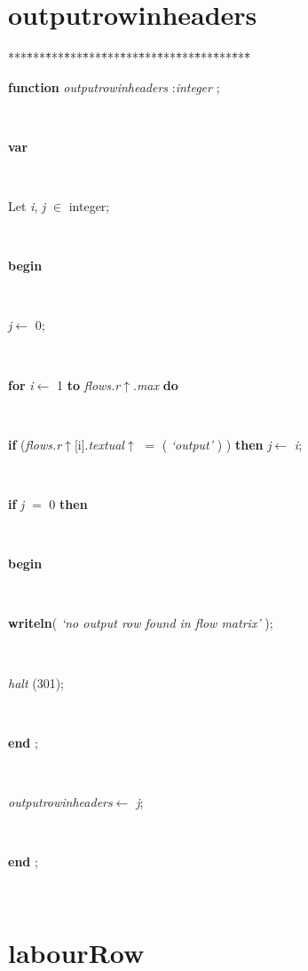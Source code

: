 \documentclass[10pt, a4paper]{article}
\begin{document}
\section{outputrowinheaders}\label{sec:harmonyplanoutputrowinheaders}

\begin{tabbing}
***\=***\=***\=***\=***\=***\=***\=***\=***\=***\=***\=***\=***\=\kill
\parbox{14cm}{\textsf{\textbf{function}  \textit{outputrowinheaders} :\textit{integer} ;}}\\
\+\parbox{14cm}{\textsf{\textbf{var} }}\\
\parbox{14cm}{\textsf{Let \textit{i}, \textit{j} $\in$ integer;}}\\
\-\<\+\parbox{14cm}{\textsf{\textbf{begin} }}\\
\parbox{14cm}{\textsf{\textit{j}$\leftarrow$ 0}; }\\
\+\parbox{14cm}{\textsf {\textbf {for } \textsf{\textit{i}$\leftarrow$ 1} \textbf{ to } \textsf{\textit{flows.r}$\uparrow$.\textit{max}} \textbf{ do } }}\\
\-\parbox{14cm}{\textsf {\textbf {if } \textsf{(\textit{flows.r}$\uparrow$\textit{}[i].\textit{textual}$\uparrow$ $=$  (\textit{\textrm{\textup { `output' } }}) )} \textbf{ then } \textsf{\textit{j}$\leftarrow$ \textit{i}}; }}\\
\+\parbox{14cm}{\textsf {\textbf {if } \textsf{\textit{j} $=$ 0} \textbf{ then } }}\\
\<\parbox{14cm}{\textsf{\textbf{begin} }}\\
\parbox{14cm}{\textsf{\textbf{writeln}(\textit{\textrm{\textup { `no output row found in flow matrix' } }})}; }\\
\parbox{14cm}{\textsf{\textit{halt} (301)}; }\\
\<\-\parbox{14cm}{\textsf{\textbf{end} ;}}\\
\parbox{14cm}{\textsf{\textit{outputrowinheaders}$\leftarrow$ \textit{j}}; }\\
\<\-\parbox{14cm}{\textsf{\textbf{end} ;}}\\
\end{tabbing}
\section{labourRow}\label{sec:harmonyplanlabourRow}
\end{document}
